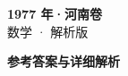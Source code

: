 \documentclass[zihao=-4, a4paper]{ctexart}
\begin{document}
\begin{center}
  {\Large\bfseries 1977 年·河南卷}\\[4pt]
  {\large 数学 · 解析版}
\end{center}
\medskip
{}

\clearpage
{}
\begin{center}{\Large\bfseries 参考答案与详细解析}\end{center}
\medskip

\end{document}
